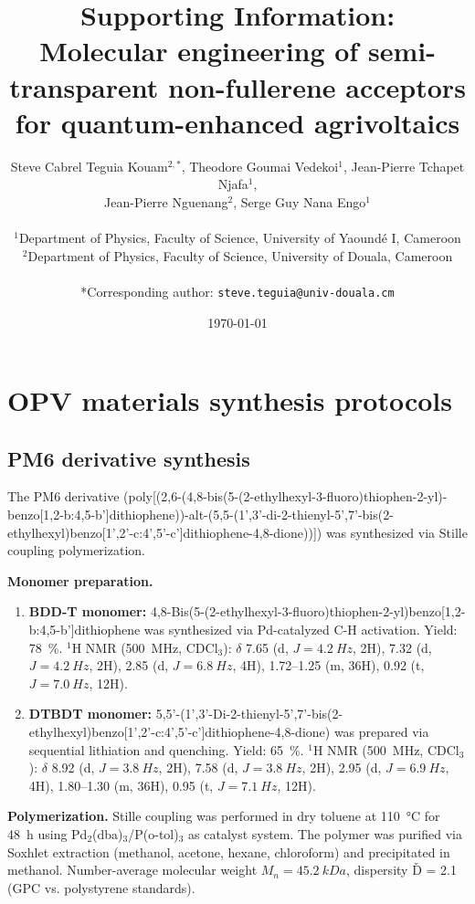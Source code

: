 \documentclass[11pt,a4paper]{article}
\title{Supporting Information:\\
Molecular engineering of semi-transparent non-fullerene acceptors for quantum-enhanced agrivoltaics}
\author{Steve Cabrel Teguia Kouam$^{2,*}$, Theodore Goumai Vedekoi$^{1}$, Jean-Pierre Tchapet Njafa$^{1}$,\\
Jean-Pierre Nguenang$^{2}$, Serge Guy Nana Engo$^{1}$\\
\\
$^{1}$Department of Physics, Faculty of Science, University of Yaound\'e I, Cameroon\\
$^{2}$Department of Physics, Faculty of Science, University of Douala, Cameroon\\
\\
*Corresponding author: \texttt{steve.teguia@univ-douala.cm}}
\date{\today}
\begin{document}
\maketitle

\tableofcontents
\newpage

\section{OPV materials synthesis protocols}\label{si:synthesis}

\subsection{PM6 derivative synthesis}

The PM6 derivative (poly[(2,6-(4,8-bis(5-(2-ethylhexyl-3-fluoro)thiophen-2-yl)-benzo[1,2-b:4,5-b']dithiophene))-alt-(5,5-(1',3'-di-2-thienyl-5',7'-bis(2-ethylhexyl)benzo[1',2'-c:4',5'-c']dithiophene-4,8-dione))]) was synthesized via Stille coupling polymerization.

\textbf{Monomer preparation.}
\begin{enumerate}
    \item \textbf{BDD-T monomer:} 4,8-Bis(5-(2-ethylhexyl-3-fluoro)thiophen-2-yl)benzo[1,2-b:4,5-b']dithiophene was synthesized via Pd-catalyzed C-H activation. Yield: \SI{78}{\percent}. $^1$H NMR (\SI{500}{MHz}, CDCl$_3$): $\delta$ 7.65 (d, $J = \SI{4.2}{Hz}$, 2H), 7.32 (d, $J = \SI{4.2}{Hz}$, 2H), 2.85 (d, $J = \SI{6.8}{Hz}$, 4H), 1.72--1.25 (m, 36H), 0.92 (t, $J = \SI{7.0}{Hz}$, 12H).

    \item \textbf{DTBDT monomer:} 5,5'-(1',3'-Di-2-thienyl-5',7'-bis(2-ethylhexyl)benzo[1',2'-c:4',5'-c']dithiophene-4,8-dione) was prepared via sequential lithiation and quenching. Yield: \SI{65}{\percent}. $^1$H NMR (\SI{500}{MHz}, CDCl$_3$): $\delta$ 8.92 (d, $J = \SI{3.8}{Hz}$, 2H), 7.58 (d, $J = \SI{3.8}{Hz}$, 2H), 2.95 (d, $J = \SI{6.9}{Hz}$, 4H), 1.80--1.30 (m, 36H), 0.95 (t, $J = \SI{7.1}{Hz}$, 12H).
\end{enumerate}

\textbf{Polymerization.} Stille coupling was performed in dry toluene at \SI{110}{\degreeCelsius} for \SI{48}{\hour} using Pd$_2$(dba)$_3$/P(o-tol)$_3$ as catalyst system. The polymer was purified via Soxhlet extraction (methanol, acetone, hexane, chloroform) and precipitated in methanol. Number-average molecular weight $M_n = \SI{45.2}{kDa}$, dispersity \v{D} = 2.1 (GPC vs. polystyrene standards).
\end{document}
